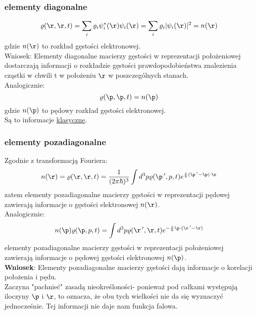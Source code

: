 \subsubsection{elementy diagonalne}
\begin{equation}{\varrho}(\r,\r,t)=
\sum_i \varrho_i\psi_i^*(\r)\psi_i(\r)=\sum_i \varrho_i|\psi_i(\r)|^2=n(\r)\end{equation}
gdzie $n(\r)$ to rozkład gęstości elektronowej.\\
Wniosek: Elementy diagonalne macierzy gęstości w reprezentacji położeniowej dostarczają informacji o rozkładzie gęstości prawdopodobieństwa znalezienia cząstki w chwili t w położeniu $\r$ w poszczególnych stanach.\\
Analogicznie:
\begin{equation}{\varrho}(\p,\p,t)=n(\p)\end{equation}
gdzie $n(\p)$ to pędowy rozkład gęstości elektronowej.\\
Są to informacje \underline{klasyczne}.
\subsubsection{elementy pozadiagonalne}
Zgodnie z transformacją Fouriera:
\begin{equation}n(\r)={\varrho}(\r,\r,t)=\frac{1}{(2\pi\hbar)^3}\int d^3p\varrho(\p\,',p,t)e^{\frac{i}{\hbar}(\p\,'-\p)\cdot\r}
\end{equation}
zatem elementy pozadiagonalne macierzy gęstości w reprezentacji pędowej zawierają informacje o gęstości elektronowej $n(\r)$.\\
Analogicznie: 
\begin{equation}n(\p){\varrho}(\p,p,t)=\int d^3p\varrho(\r\,',\r,t)e^{-\frac{i}{\hbar}\p\cdot(\r\,'-\r)}
\end{equation}
elementy pozadiagonalne macierzy gęstości w reprezentacji położeniowej zawierają informacje o pędowej gęstości elektronowej $n(\p)$.\\
\textbf{Wniosek}: Elementy pozadiagonalne macierzy gęstości  dają informacje o korelacji położenia i pędu.\\
Zaczyna "pachnieć" zasadą nieokreśloności- ponieważ pod całkami występują iloczyny $\p$ i $\r$, to oznacza, że obu tych wielkości nie da się wyznaczyć jednocześnie. Tej informacji nie daje nam funkcja falowa.
